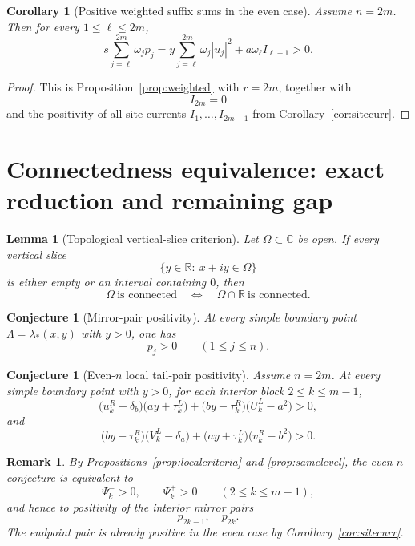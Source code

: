 \documentclass[11pt]{article}
\newtheorem{lemma}[theorem]{Lemma}
\newtheorem{corollary}[theorem]{Corollary}
\newtheorem{remark}[theorem]{Remark}
\newtheorem{conjecture}[theorem]{Conjecture}
\newcommand{\C}{\mathbb C}
\newcommand{\R}{\mathbb R}
\begin{document}
\begin{corollary}[Positive weighted suffix sums in the even case]\label{cor:weightsuffix}
Assume \(n=2m\). Then for every \(1\le \ell\le 2m\),
\[
s\sum_{j=\ell}^{2m} \omega_j p_j
=
y\sum_{j=\ell}^{2m}\omega_j |u_j|^2
+
a\omega_\ell I_{\ell-1}
>0.
\]
\end{corollary}

\begin{proof}
This is Proposition~\ref{prop:weighted} with \(r=2m\), together with
\[
I_{2m}=0
\]
and the positivity of all site currents \(I_1,\dots,I_{2m-1}\) from
Corollary~\ref{cor:sitecurr}.
\end{proof}

\section{Connectedness equivalence: exact reduction and remaining gap}

\begin{lemma}[Topological vertical-slice criterion]\label{lem:topological}
Let \(\Omega\subset\C\) be open. If every vertical slice
\[
\{y\in\R:\ x+iy\in\Omega\}
\]
is either empty or an interval containing \(0\), then
\[
\Omega\ \text{is connected}
\quad\Longleftrightarrow\quad
\Omega\cap\R\ \text{is connected}.
\]
\end{lemma}

\begin{conjecture}[Mirror-pair positivity]\label{conj:mirror}
At every simple boundary point \(\Lambda=\lambda_*(x,y)\) with \(y>0\), one has
\[
p_j>0
\qquad (1\le j\le n).
\]
\end{conjecture}

\begin{conjecture}[Even-\(n\) local tail-pair positivity]\label{conj:tailpair}
Assume \(n=2m\). At every simple boundary point with \(y>0\), for each interior block
\(2\le k\le m-1\),
\[
\bigl(u_k^R-\delta_b\bigr)\bigl(ay+\tau_k^L\bigr)
+
\bigl(by-\tau_k^R\bigr)\bigl(U_k^L-a^2\bigr)>0,
\]
and
\[
\bigl(by-\tau_k^R\bigr)\bigl(V_k^L-\delta_a\bigr)
+
\bigl(ay+\tau_k^L\bigr)\bigl(v_k^R-b^2\bigr)>0.
\]
\end{conjecture}

\begin{remark}
By Propositions~\ref{prop:localcriteria} and \ref{prop:samelevel}, the even-\(n\) conjecture is
equivalent to
\[
\Psi_k^- >0,
\qquad
\Psi_k^+ >0
\qquad
(2\le k\le m-1),
\]
and hence to positivity of the interior mirror pairs
\[
p_{2k-1},\quad p_{2k}.
\]
The endpoint pair is already positive in the even case by Corollary~\ref{cor:sitecurr}.
\end{remark}
\end{document}
